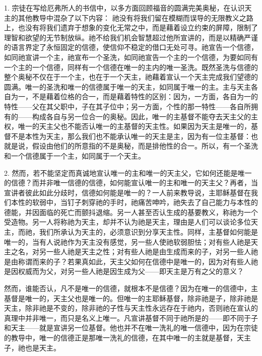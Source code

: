 1. 宗徒在写给厄弗所人的书信中，以多方面回顾福音的圆满完美奥秘，在认识天主的其他教导中混杂了以下内容：  祂没有将我们留在模糊而误导的无限教义之路上，也没有将我们遗弃于想象的变化无常之中，而是藉着设立约束的屏障，限制了理智和欲望的无节制放纵。祂不给我们机会智慧超过他所宣讲的，而是以精确严谨的语言界定了永恒固定的信德，使信仰不稳定的借口无处可寻。祂宣告一个信德，如同祂宣讲一个主，祂宣布一个圣洗，如同祂宣告一个主的一个信德，为要如同有一个主的一个信德，同样有一个信德在唯一的主内的唯一圣洗。既然圣洗与信德的整个奥秘不仅在于一个主，也在于一个天主，祂藉着宣认一个天主完成我们望德的圆满。唯一的圣洗和唯一的信德属于唯一的天主，如同属于唯一的主。主与天主各自为一，不是藉着位格的合一，而是藉着特性的区别：因为，一方面，各自为一的特性——父在其父职中，子在其子位中；另一方面，个性的那一特性——各自所拥有的——构成各自与另一位合一的奥秘。因此，唯一的主基督不能夺去天主父的主权，唯一的天主父也不能否认唯一的主基督的天主性。如果因为天主是唯一的，基督不是本性为天主，那么我们也不能承认唯一的天主是主，因为有一位主基督：也就是说，假设由他们的所意指的不是奥秘，而是排他性的合一。所以，有一个圣洗和一个信德属于一个主，如同属于一个天主。\par

2. 然而，若不能坚定而真诚地宣认唯一的主和唯一的天主父，它如何还能是唯一的信德？而并非唯一信德的信德，如何能宣认唯一的主和唯一的天主父？再者，当宣讲者彼此如此分歧时，信德如何能是唯一的？一人前来教导说，主耶稣基督在我们本性的软弱中，当钉子刺穿祂的手时，祂痛苦呻吟，祂失去了自己能力与本性的德能，并因面临的死亡而颤抖退缩。另一人甚至否认生成的基要教义，称祂为一个受造物。另一人将称祂为天主，却并不认为祂是天主，理由是人们可以谈论多位天主，而祂，我们所承认为天主的，必须意识到分享天主性。同样，主基督如何能是唯一的，当有人说祂作为天主没有感觉，另一些人使祂软弱胆怯；对有些人祂是天主之名，对另一些人祂是天主之性；对有些人祂是由生成而来的子，对另一些人祂是由称谓而来的子？若果真如此，天主父如何在信德中是唯一的，因为对有些人祂是因权威而为父，对另一些人祂是因生成为父——即天主是万有之父的意义？\par

然而，谁能否认，凡不是唯一的信德，就根本不是信德？因为在唯一的信德中，主基督是唯一的，天主父也是唯一的。但唯一的主耶稣基督，除非祂是子，除非祂是天主，除非祂是不变的，除非祂的子性与天主性永远存在于祂内，否则祂在宣认的真理中并非唯一，而只是名义上唯一。凡宣讲基督不同于祂所是的——即不同于子和天主——就是宣讲另一位基督。他也并不在唯一洗礼的唯一信德中，因为在宗徒的教导中，唯一的信德正是那唯一洗礼的信德，在其中唯一的主就是基督，天主子，祂也是天主。\par

